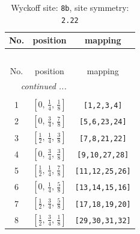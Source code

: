 \documentclass[fleqn,8pt]{jsarticle}
\begin{document}
\begin{longtable}{ccc}
\caption{Wyckoff site: {\tt 8b}, site symmetry: {\tt 2.22}}
 \\
 \hline \hline
No. & position & mapping \\ \hline \endfirsthead

\multicolumn{2}{l}{\tablename\ \thetable{}} \\
 \hline \hline
No. & position & mapping \\ \hline \endhead

 \hline \hline
\multicolumn{2}{r}{\footnotesize\it continued ...} \\ \endfoot

 \hline \hline
\multicolumn{2}{r}{} \\ \endlastfoot

1 & $\left[ 0,\, \frac{1}{4},\, \frac{1}{8} \right]$ & {\tt [1,2,3,4]} \\ \hline
2 & $\left[ 0,\, \frac{3}{4},\, \frac{7}{8} \right]$ & {\tt [5,6,23,24]} \\ \hline
3 & $\left[ \frac{1}{2},\, \frac{1}{4},\, \frac{3}{8} \right]$ & {\tt [7,8,21,22]} \\ \hline
4 & $\left[ 0,\, \frac{3}{4},\, \frac{3}{8} \right]$ & {\tt [9,10,27,28]} \\ \hline
5 & $\left[ \frac{1}{2},\, \frac{1}{4},\, \frac{7}{8} \right]$ & {\tt [11,12,25,26]} \\ \hline
6 & $\left[ 0,\, \frac{1}{4},\, \frac{5}{8} \right]$ & {\tt [13,14,15,16]} \\ \hline
7 & $\left[ \frac{1}{2},\, \frac{3}{4},\, \frac{5}{8} \right]$ & {\tt [17,18,19,20]} \\ \hline
8 & $\left[ \frac{1}{2},\, \frac{3}{4},\, \frac{1}{8} \right]$ & {\tt [29,30,31,32]} \\
\end{longtable}
\renewcommand{\arraystretch}{1.2}
\end{document}
